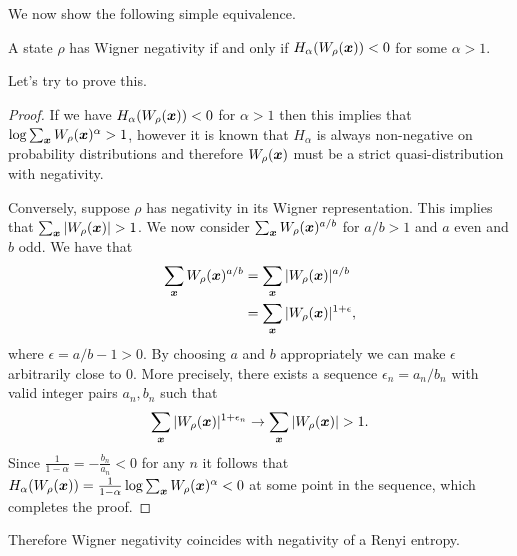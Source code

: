 \documentclass[pra,
aps,
twocolumn,
superscriptaddress,
groupedaddress,
nofootinbib,
reprint
]{revtex4-1}
\begin{document}
We now show the following simple equivalence.
\begin{theorem} A state $\rho$ has Wigner negativity if and only if $H_\alpha (W_\rho (\boldsymbol{x})) < 0$ for some $\alpha >1$.
\end{theorem}
Let's try to prove this.

\begin{proof} If we have $H_\alpha (W_\rho(\boldsymbol{x})) <0 $ for $\alpha >1$ then this implies that $\log \sum_{\boldsymbol{x}} W_\rho (\boldsymbol{x})^\alpha > 1$, however it is known that $H_\alpha$ is always non-negative on probability distributions and therefore $W_\rho(\boldsymbol{x})$ must be a strict quasi-distribution with negativity.

Conversely, suppose $\rho$ has negativity in its Wigner representation. This implies that $\sum_{\boldsymbol{x}} |W_\rho (\boldsymbol{x})| >1$. We now consider $\sum_{\boldsymbol{x}} W_\rho (\boldsymbol{x})^{a/b}$ for $a/b >1$ and $a$ even and $b$ odd. We have that
\begin{align}
\sum_{\boldsymbol{x}} W_\rho (\boldsymbol{x})^{a/b} &= \sum_{\boldsymbol{x}} |W_\rho (\boldsymbol{x})|^{a/b} \nonumber \\
&= \sum_{\boldsymbol{x}} |W_\rho (\boldsymbol{x})|^{1+ \epsilon},
\end{align}
where $\epsilon = a/b - 1 >0$. By choosing $a$ and $b$ appropriately we can make $\epsilon$ arbitrarily close to $0$. More precisely, there exists a sequence $\epsilon_n=a_n/b_n$ with valid integer pairs $a_n, b_n$ such that
\begin{equation}
\sum_{\boldsymbol{x}} |W_\rho (\boldsymbol{x})|^{1+ \epsilon_n} \rightarrow \sum_{\boldsymbol{x}} |W_\rho (\boldsymbol{x})| >1.
\end{equation}
Since $\frac{1}{1-\alpha}= -\frac{b_n}{a_n} <0$ for any $n$ it follows that $H_\alpha (W_\rho (\boldsymbol{x})) = \frac{1}{1-\alpha} \log \sum_{\boldsymbol{x}} W_\rho (\boldsymbol{x})^\alpha  <0 $ at some point in the sequence, which completes the proof.
\end{proof}

Therefore Wigner negativity coincides with negativity of a Renyi entropy.


\end{document}
